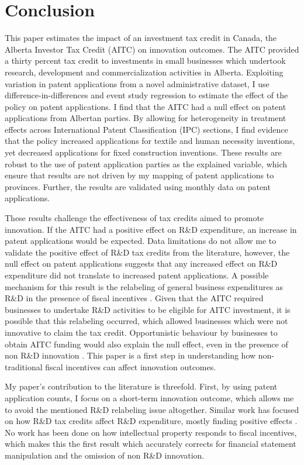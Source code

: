 \documentclass[../main.tex]{subfiles}
\begin{document}
\section{Conclusion}
\label{sec:conclusions}

This paper estimates the impact of an investment tax credit in Canada, the Alberta Investor Tax Credit (AITC) on innovation outcomes. The AITC provided a thirty percent tax credit to investments in small businesses which undertook research, development and commercialization activities in Alberta. Exploiting variation in patent applications from a novel administrative dataset, I use difference-in-differences and event study regression to estimate the effect of the policy on patent applications. I find that the AITC had a null effect on patent applications from Albertan parties. By allowing for heterogeneity in treatment effects across International Patent Classification (IPC) sections, I find evidence that the policy increased applications for textile and human necessity inventions, yet decreased applications for fixed construction inventions. These results are robust to the use of patent application parties as the explained variable, which ensure that results are not driven by my mapping of patent applications to provinces. Further, the results are validated using monthly data on patent applications. 

These results challenge the effectiveness of tax credits aimed to promote innovation. If the AITC had a positive effect on R\&D expenditure, an increase in patent applications would be expected. Data limitations do not allow me to validate the positive effect of R\&D tax credits from the literature, however, the null effect on patent applications suggests that any increased effect on R\&D expenditure did not translate to increased patent applications. A possible mechanism for this result is the relabeling of general business expenditures as R\&D in the presence of fiscal incentives \parencite{chen_etal21}. Given that the AITC required businesses to undertake R\&D activities to be eligible for AITC investment, it is possible that this relabeling occurred, which allowed businesses which were not innovative to claim the tax credit. Opportunistic behaviour by businesses to obtain AITC funding would also explain the null effect, even in the presence of non R\&D innovation \parencite{xie_etal19}. This paper is a first step in understanding how non-traditional fiscal incentives can affect innovation outcomes. 

My paper's contribution to the literature is threefold. First, by using patent application counts, I focus on a short-term innovation outcome, which allows me to avoid the mentioned R\&D relabeling issue altogether. Similar work has focused on how R\&D tax credits affect R\&D expenditure, mostly finding positive effects \parencite{guceri18,rao16,guceri_liu19,becker15}. No work has been done on how intellectual property responds to fiscal incentives, which makes this the first result which accurately corrects for financial statement manipulation and the omission of non R\&D innovation.
\end{document}
